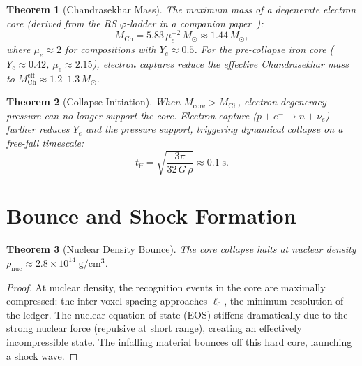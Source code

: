 \documentclass[12pt,a4paper]{article}
\newtheorem{theorem}{Theorem}[section]
\theoremstyle{definition}
\theoremstyle{remark}
\begin{document}
\begin{theorem}[Chandrasekhar Mass]
\label{thm:chandra}
The maximum mass of a degenerate electron core (derived from the
RS $\varphi$-ladder in a companion paper~\cite{RS_Chandrasekhar}):
\begin{equation}
  M_{\mathrm{Ch}} = 5.83\,\mu_e^{-2}\,M_\odot
  \approx 1.44\,M_\odot,
\end{equation}
where $\mu_e \approx 2$ for compositions with $Y_e \approx 0.5$.
For the pre-collapse iron core ($Y_e \approx 0.42$,
$\mu_e \approx 2.15$), electron captures reduce the
effective Chandrasekhar mass to
$M_{\mathrm{Ch}}^{\mathrm{eff}} \approx 1.2$--$1.3\,M_\odot$.
\end{theorem}

\begin{theorem}[Collapse Initiation]
When $M_{\mathrm{core}} > M_{\mathrm{Ch}}$, electron degeneracy
pressure can no longer support the core.  Electron capture
($p + e^- \to n + \nu_e$) further reduces $Y_e$ and the pressure
support, triggering dynamical collapse on a free-fall timescale:
\begin{equation}
  t_{\mathrm{ff}} = \sqrt{\frac{3\pi}{32\,G\,\rho}} \approx
  0.1\;\mathrm{s}.
\end{equation}
\end{theorem}

\section{Bounce and Shock Formation}
\label{sec:bounce}

\begin{theorem}[Nuclear Density Bounce]
\label{thm:bounce}
The core collapse halts at nuclear density
$\rho_{\mathrm{nuc}} \approx 2.8 \times
10^{14}\;\mathrm{g/cm^3}$.
\end{theorem}

\begin{proof}
At nuclear density, the recognition events in the core are maximally
compressed: the inter-voxel spacing approaches $\ell_0$, the minimum
resolution of the ledger.  The nuclear equation of state (EOS)
stiffens dramatically due to the strong nuclear force (repulsive at
short range), creating an effectively incompressible state.  The
infalling material bounces off this hard core, launching a shock
wave.
\end{proof}
\end{document}
